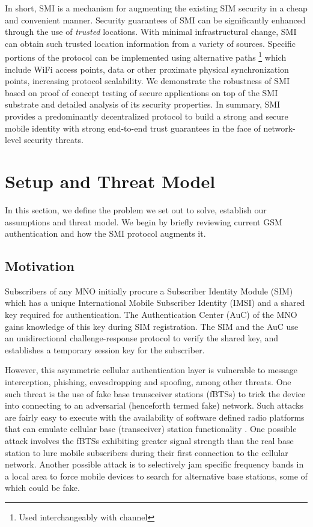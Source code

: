 \documentclass[letterpaper,twocolumn]{sig-alternate}
\begin{document}
In short, SMI is a mechanism for augmenting the existing SIM security in a cheap and convenient manner. Security guarantees of SMI can be
significantly enhanced through the use of {\em trusted} locations. With minimal infrastructural change, SMI can obtain such trusted location information from a variety of sources. Specific portions of the protocol can be implemented using alternative paths \footnote{Used interchangeably with channel} which include WiFi access points, data or other proximate physical synchronization points, increasing protocol scalability. We demonstrate the robustness of SMI based on proof of concept testing of secure applications on top of the SMI substrate and detailed analysis of its security properties. In summary, SMI provides a predominantly decentralized protocol to build a strong and secure mobile identity with strong end-to-end trust guarantees in the face of network-level security threats.


 \section{Setup and Threat Model}
\label{probsettings}

In this section, we define the problem we set out to solve, establish our assumptions and threat model. We begin by briefly reviewing current GSM authentication and how the SMI protocol augments it.

\subsection{Motivation}
\label{threats}

 Subscribers of any MNO initially procure a Subscriber Identity Module (SIM) which has a unique International Mobile Subscriber Identity (IMSI) and a shared key required for authentication. The Authentication Center (AuC) of the MNO gains knowledge of this key during SIM registration. The SIM and the AuC use an unidirectional challenge-response protocol to verify the shared key, and establishes a temporary session key for the subscriber.

 However, this asymmetric cellular authentication layer is vulnerable to message interception, phishing, eavesdropping and spoofing, among other threats. One such threat is the use of fake base transceiver stations (fBTSs) to trick the device into connecting to an adversarial (henceforth termed fake) network. Such attacks are fairly easy to execute with the availability of software defined radio platforms that can emulate cellular base (transceiver) station functionality \cite{opencell, openbts, openbsc, usrp, sysmobts, fairwaves}. One possible attack involves the fBTSs exhibiting greater signal strength than the real base station to lure mobile subscribers during their first connection to the cellular network. Another possible attack is to selectively jam specific frequency bands in a local area to force mobile devices to search for alternative base stations, some of which could be fake. 
\end{document}

